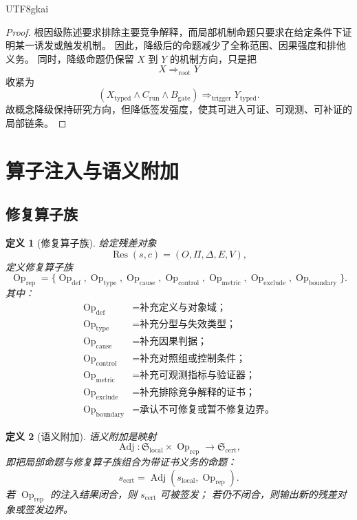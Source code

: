 \documentclass[12pt]{article}
\newtheorem{definition}{定义}[section]
\newcommand{\Stmt}{\mathfrak S}
\newcommand{\Op}{\operatorname{Op}}
\newcommand{\Adj}{\operatorname{Adj}}
\newcommand{\Res}{\operatorname{Res}}
\begin{document}
\begin{CJK*}{UTF8}{gkai}
\begin{proof}
根因级陈述要求排除主要竞争解释，而局部机制命题只要求在给定条件下证明某一诱发或触发机制。
因此，降级后的命题减少了全称范围、因果强度和排他义务。
同时，降级命题仍保留 \(X\) 到 \(Y\) 的机制方向，只是把
\[
  X\Rightarrow_{\mathrm{root}}Y
\]
收紧为
\[
  (X_{\mathrm{typed}}\wedge C_{\mathrm{run}}\wedge B_{\mathrm{gate}})
  \Rightarrow_{\mathrm{trigger}}Y_{\mathrm{typed}}.
\]
故概念降级保持研究方向，但降低签发强度，使其可进入可证、可观测、可补证的局部链条。
\end{proof}

\section{算子注入与语义附加}
\label{sec:tex52-operator-injection}

\subsection{修复算子族}
\label{subsec:tex52-operator-family}

\begin{definition}[修复算子族]
给定残差对象
\[
  \Res(s,c)=(O,\Pi,\Delta,E,V),
\]
定义修复算子族
\[
  \Op_{\mathrm{rep}}
  =
  \{
    \Op_{\mathrm{def}},
    \Op_{\mathrm{type}},
    \Op_{\mathrm{cause}},
    \Op_{\mathrm{control}},
    \Op_{\mathrm{metric}},
    \Op_{\mathrm{exclude}},
    \Op_{\mathrm{boundary}}
  \}.
\]
其中：
\[
\begin{aligned}
  \Op_{\mathrm{def}}&=\text{补充定义与对象域；}\\
  \Op_{\mathrm{type}}&=\text{补充分型与失效类型；}\\
  \Op_{\mathrm{cause}}&=\text{补充因果判据；}\\
  \Op_{\mathrm{control}}&=\text{补充对照组或控制条件；}\\
  \Op_{\mathrm{metric}}&=\text{补充可观测指标与验证器；}\\
  \Op_{\mathrm{exclude}}&=\text{补充排除竞争解释的证书；}\\
  \Op_{\mathrm{boundary}}&=\text{承认不可修复或暂不修复边界。}
\end{aligned}
\]
\end{definition}

\begin{definition}[语义附加]
语义附加是映射
\[
  \Adj:
  \Stmt_{\mathrm{local}}\times\Op_{\mathrm{rep}}
  \to
  \Stmt_{\mathrm{cert}},
\]
即把局部命题与修复算子族组合为带证书义务的命题：
\[
  s_{\mathrm{cert}}
  =
  \Adj(s_{\mathrm{local}},\Op_{\mathrm{rep}}).
\]
若 \(\Op_{\mathrm{rep}}\) 的注入结果闭合，则 \(s_{\mathrm{cert}}\) 可被签发；
若仍不闭合，则输出新的残差对象或签发边界。
\end{definition}


\end{CJK*}
\end{document}
